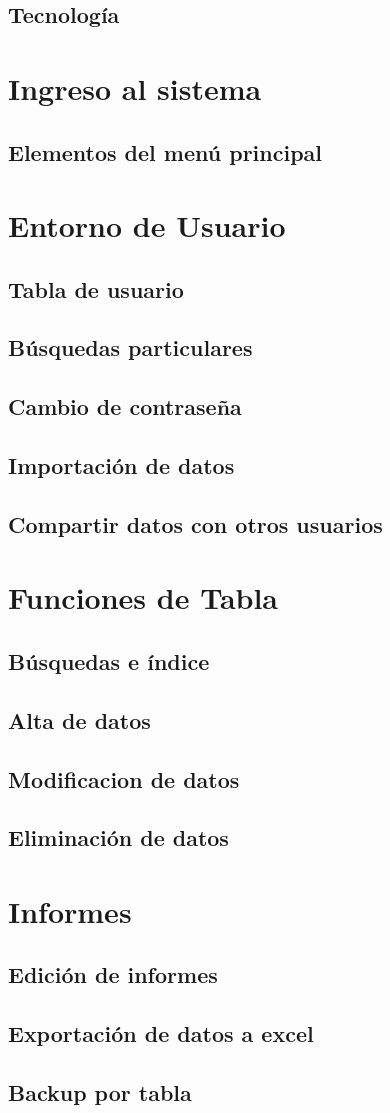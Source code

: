 \documentclass[a4paper,10pt]{article}
\begin{document}
\subsection{Tecnología}
\section{Ingreso al sistema}
\subsection{Elementos del menú principal}


\section{Entorno de Usuario}
\subsection{Tabla de usuario}
\subsection{Búsquedas particulares}
\subsection{Cambio de contraseña}
\subsection{Importación de datos}
\subsection{Compartir datos con otros usuarios}


\section{Funciones de Tabla}
\subsection{Búsquedas e índice}
\subsection{Alta de datos}
\subsection{Modificacion de datos}
\subsection{Eliminación de datos}


\section{Informes}
\subsection{Edición de informes}
\subsection{Exportación de datos a excel}
\subsection{Backup por tabla}
\end{document}
